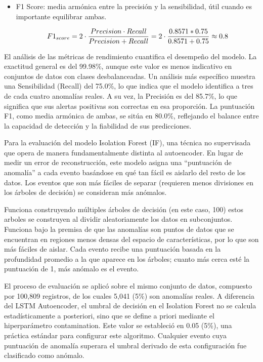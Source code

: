 \begin{itemize}
      \item F1 Score: media armónica entre la precisión y la sensibilidad, útil cuando es importante equilibrar ambas.

            \begin{align}
                  F1_{score} = 2 \cdot \frac{Precision \cdot Recall}{Precision + Recall} = 2 \cdot \frac{0.8571 * 0.75}{0.8571+0.75} \approx 0.8 \notag \\
                  \label{eq:f1score}
            \end{align}

\end{itemize}

El análisis de las métricas de rendimiento cuantifica el desempeño del modelo. La exactitud general es del 99.98\%, aunque este valor es menos indicativo en conjuntos de datos con clases desbalanceadas. Un análisis más específico muestra una Sensibilidad (Recall) del 75.0\%, lo que indica que el modelo identifica a tres de cada cuatro anomalías reales. A su vez, la Precisión es del 85.7\%, lo que significa que sus alertas positivas son correctas en esa proporción. La puntuación F1, como media armónica de ambas, se sitúa en 80.0\%, reflejando el balance entre la capacidad de detección y la fiabilidad de sus predicciones.


Para la  evaluación del modelo Isolation Forest (IF), una técnica no supervisada que opera de manera fundamentalmente distinta al autoencoder. En lugar de medir un error de reconstrucción, este modelo asigna una ``puntuación de anomalía'' a cada evento basándose en qué tan fácil es aislarlo del resto de los datos. Los eventos que son más fáciles de separar (requieren menos divisiones en los árboles de decisión) se consideran más anómalos.

Funciona construyendo múltiples árboles de decisión (en este caso, 100) estos arboles se construyen al dividir aleatoriamente los datos en subconjuntos. Funciona bajo la premisa de que las anomalías son puntos de datos que se encuentran en regiones menos densas del espacio de características, por lo que son más fáciles de aislar. Cada evento recibe una puntuación basada en la profundidad promedio a la que aparece en los árboles; cuanto más cerca esté la puntuación de 1, más anómalo es el evento.

El proceso de evaluación se aplicó sobre el mismo conjunto de datos, compuesto por 100,809 registros, de los cuales 5,041 (5\%) son anomalías reales. A diferencia del LSTM Autoencoder, el umbral de decisión en el Isolation Forest no se calcula estadísticamente a posteriori, sino que se define a priori mediante el hiperparámetro contamination. Este valor se estableció en 0.05 (5\%), una práctica estándar para configurar este algoritmo. Cualquier evento cuya puntuación de anomalía superara el umbral derivado de esta configuración fue clasificado como anómalo.

